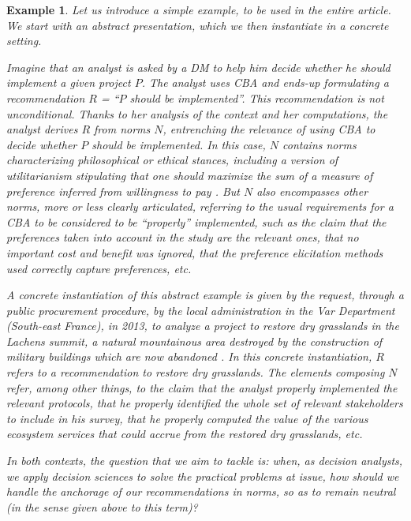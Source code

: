 \documentclass[preprint, french, english, 11pt, authoryear]{elsarticle}%
\newtheorem{example}{Example}
\begin{document}
\begin{example}
Let us introduce a simple example, to be used in the entire article. %
We start with an abstract presentation, which we then instantiate in a concrete setting.

Imagine that an analyst is asked by a \ac{DM} to help him decide whether he should implement a given project $P$.
The analyst uses \ac{CBA} \citep{layard_cost-benefit_1994} and ends-up formulating a recommendation $R$ = “$P$ should be implemented”.
This recommendation is not unconditional.
Thanks to her analysis of the context and her computations, the analyst derives $R$ from norms $N$, entrenching the relevance of using \ac{CBA} to decide whether $P$ should be implemented.
In this case, $N$ contains norms characterizing philosophical or ethical stances, including a version of utilitarianism stipulating that one should maximize the sum of a measure of preference inferred from willingness to pay \citep{meinard_ethical_2016}. 
But $N$ also encompasses other norms, more or less clearly articulated, referring to the usual requirements for a \ac{CBA} to be considered to be ``properly'' implemented, such as the claim that the preferences taken into account in the study are the relevant ones,
that no important cost and benefit was ignored, that the preference elicitation methods used correctly capture preferences, etc.

A concrete instantiation of this abstract example is given by the request, through a public procurement procedure, by the local administration in the Var Department (South-east France), in 2013, to analyze a project to restore dry grasslands in the Lachens summit, 
a natural mountainous area destroyed by the construction of military buildings which are now abandoned \citep{meinard_etude_2015}.
In this concrete instantiation, $R$ refers to a recommendation to restore dry grasslands. 
The elements composing $N$ refer, among other things, to the claim that the analyst properly implemented the relevant protocols, 
that he properly identified the whole set of relevant stakeholders to include in his survey, that he properly computed the value of the various ecosystem services that could accrue from the restored dry grasslands, etc.

In both contexts, the question that we aim to tackle is: when, as decision analysts, we apply decision sciences to solve the practical problems at issue, how should we handle the anchorage of our recommendations in norms, so as to remain neutral (in the sense given above to this term)?
\end{example}
\end{document}
